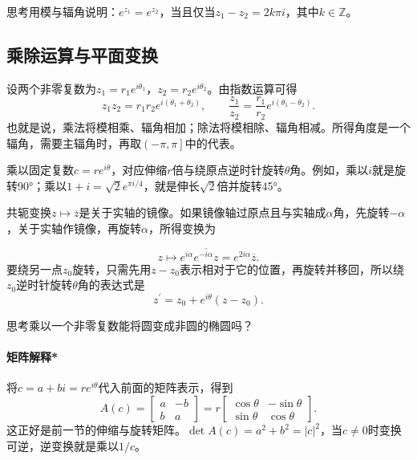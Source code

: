 {\kaiti{}思考\quad 用模与辐角说明：\(e^{z_{1}} = e^{z_{2}}\)，当且仅当\(z_{1} - z_{2} = 2 k \pi i\)，其中\(k \in \mathbb{Z}\)。}

\subsection{乘除运算与平面变换}
设两个非零复数为\(z_{1} = r_{1} e^{i \theta_{1}}\)，\(z_{2} = r_{2} e^{i \theta_{2}}\)。由指数运算可得
\begin{equation}
    z_{1} z_{2} = r_{1} r_{2} e^{i \left( \theta_{1} + \theta_{2} \right)} , \qquad
    \frac{z_{1}}{z_{2}} = \frac{r_{1}}{r_{2}} e^{i \left( \theta_{1} - \theta_{2} \right)} .
\end{equation}
也就是说，乘法将模相乘、辐角相加；除法将模相除、辐角相减。所得角度是一个辐角，需要主辐角时，再取\(\left( - \pi , \pi \right]\)中的代表。

\begin{samepage}
乘以固定复数\(c = r e^{i \theta}\)，对应伸缩\(r\)倍与绕原点逆时针旋转\(\theta\)角。例如，乘以\(i\)就是旋转90°；乘以\(1 + i = \sqrt{2} e^{\pi i / 4}\)，就是伸长\(\sqrt{2}\)倍并旋转45°。
\par
\end{samepage}

\begin{samepage}
共轭变换\(z \mapsto \overline{z}\)是关于实轴的镜像。如果镜像轴过原点且与实轴成\(\alpha\)角，先旋转\(- \alpha\)，关于实轴作镜像，再旋转\(\alpha\)，所得变换为
\par
\end{samepage}
\begin{equation}
    z \longmapsto e^{i \alpha} \overline{e^{- i \alpha} z} = e^{2 i \alpha} \overline{z} .
\end{equation}
要绕另一点\(z_{0}\)旋转，只需先用\(z - z_{0}\)表示相对于它的位置，再旋转并移回，所以绕\(z_{0}\)逆时针旋转\(\theta\)角的表达式是
\begin{equation}\label{eq:complex-rotation-center}
    z^{\prime} = z_{0} + e^{i \theta} \left( z - z_{0} \right) .
\end{equation}

{\kaiti{}思考\quad 乘以一个非零复数能将圆变成非圆的椭圆吗？}

\newpage
\paragraph{矩阵解释*} \mbox{}\nopagebreak[4]

将\(c = a + b i = r e^{i \theta}\)代入前面的矩阵表示，得到
\begin{equation}
    A \left( c \right) = \left[ \begin{matrix}a & - b \\ b & a\end{matrix} \right]
    = r \left[ \begin{matrix}\cos \theta & - \sin \theta \\ \sin \theta & \cos \theta\end{matrix} \right] .
\end{equation}
这正好是前一节的伸缩与旋转矩阵。\(\det A \left( c \right) = a^{2} + b^{2} = \left| c \right|^{2}\)，当\(c \ne 0\)时变换可逆，逆变换就是乘以\(1 / c\)。

